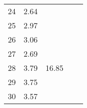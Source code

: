 \begin{center}
\begin{tabular}{| l || c | c | c | c |}
24 & \multirow{1}{*}{ 2.64 }  & & & \\\cline{2-2}
25 & \multirow{1}{*}{ 2.97 }  & & & \\\cline{2-2}\cline{3-3}
26 & \multirow{1}{*}{ 3.06 }  & \multirow{5}{*}{ 16.85 }  & & \\\cline{2-2}
27 & \multirow{1}{*}{ 2.69 }  & & & \\\cline{2-2}
28 & \multirow{1}{*}{ 3.79 }  & & & \\\cline{2-2}
29 & \multirow{1}{*}{ 3.75 }  & & & \\\cline{2-2}
30 & \multirow{1}{*}{ 3.57 }  & & & \\\cline{2-2}\cline{3-3}\cline{4-4}\cline{5-5}
\hline\end{tabular}
\end{center}